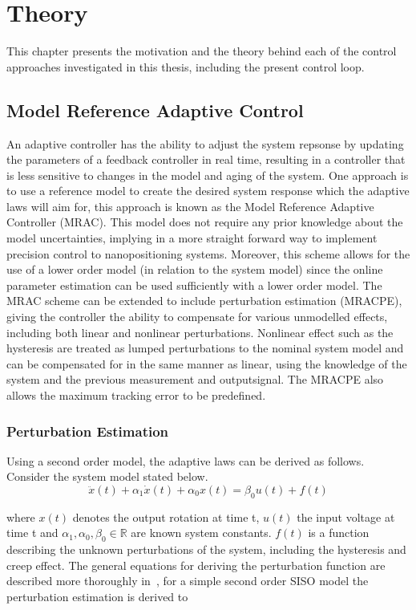 \chapter{Theory}\label{cha:modelling}
This chapter presents the motivation and the theory behind each of the control approaches investigated in this thesis, including the present control loop.

\section{Model Reference Adaptive Control}
An adaptive controller has the ability to adjust the system repsonse by updating the parameters of a feedback controller in real time, resulting in a controller that is less sensitive to changes in the model and aging of the system. One approach is to use a reference model to create the desired system response which the adaptive laws will aim for, this approach is known as the Model Reference Adaptive Controller (MRAC). This model does not require any prior knowledge about the model uncertainties, implying in a more straight forward way to implement precision control to nanopositioning systems. Moreover, this scheme allows for the use of a lower order model (in relation to the system model) since the online parameter estimation can be used sufficiently with a lower order model. The MRAC scheme can be extended to include perturbation estimation (MRACPE), giving the controller the ability to compensate for various unmodelled effects, including both linear and nonlinear perturbations. Nonlinear effect such as the hysteresis are treated as lumped perturbations to the nominal system model and can be compensated for in the same manner as linear, using the knowledge of the system and the previous measurement and outputsignal. The MRACPE also allows the maximum tracking error to be predefined.


\subsection{Perturbation Estimation}\label{sec:pertest}
Using a second order model, the adaptive laws can be derived as follows. Consider the system model stated below.
\begin{equation}
  \label{eq:sysmodel}
  \ddot{x}(t) + \alpha_1\dot{x}(t) +  \alpha_0x(t) = \beta_0u(t) + f(t)
\end{equation}

where $x(t)$ denotes the output rotation at time t, $u(t)$ the input voltage at time t and $\alpha_1, \alpha_0, \beta_0 \in \mathbb{R}$ are known system constants. $f(t)$ is a function describing the unknown perturbations of the system, including the hysteresis and creep effect. The general equations for deriving the perturbation function are described more thoroughly in~\cite{Elmali:1996}, for a simple second order SISO model the perturbation estimation is derived to

